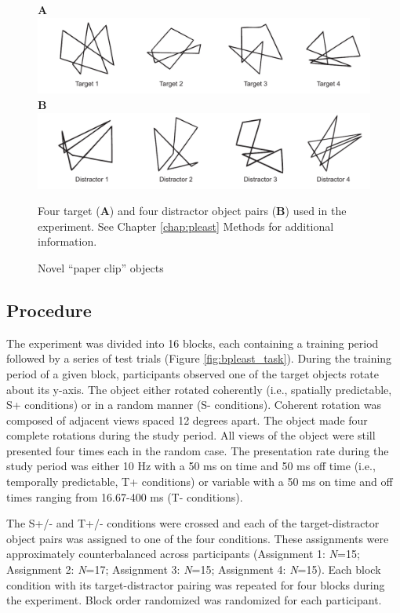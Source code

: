 \documentclass[dwyatte_dissertation.tex]{subfiles}
\begin{document}
\begin{figure}[h!]
\textbf{A} \\
\includegraphics[width=160mm]{figs/chap_bpleast/paperclip_targets.pdf} \\
\textbf{B} \\
\includegraphics[width=160mm]{figs/chap_bpleast/paperclip_distractors.pdf} \\
\caption{Novel ``paper clip'' objects}{Four target (\textbf{A}) and four distractor object pairs (\textbf{B}) used in the experiment. See Chapter \ref{chap:pleast} Methods for additional information.}
\label{fig:bpleast_objs}
\end{figure}

\subsection{Procedure}
The experiment was divided into 16 blocks, each containing a training period followed by a series of test trials (Figure \ref{fig:bpleast_task}). During the training period of a given block, participants observed one of the target objects rotate about its y-axis. The object either rotated coherently (i.e., spatially predictable, S+ conditions) or in a random manner (S- conditions). Coherent rotation was composed of adjacent views spaced 12 degrees apart. The object made four complete rotations during the study period. All views of the object were still presented four times each in the random case. The presentation rate during the study period was either 10 Hz with a 50 ms on time and 50 ms off time (i.e., temporally predictable, T+ conditions) or variable with a 50 ms on time and off times ranging from 16.67-400 ms (T- conditions). 

The S+/- and T+/- conditions were crossed and each of the target-distractor object pairs was assigned to one of the four conditions. These assignments were approximately counterbalanced across participants (Assignment 1: \textit{N}=15; Assignment 2: \textit{N}=17; Assignment 3: \textit{N}=15; Assignment 4: \textit{N}=15). Each block condition with its target-distractor pairing was repeated for four blocks during the experiment. Block order randomized was randomized for each participant.
\end{document}
